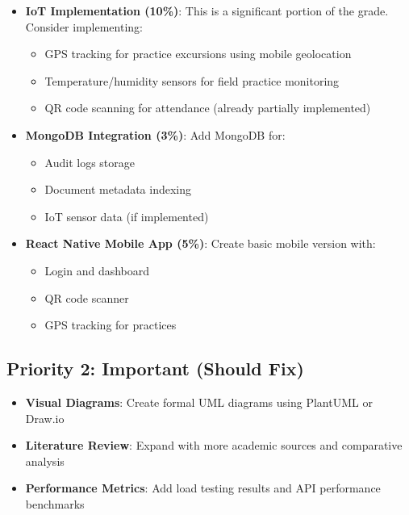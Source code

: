\documentclass[12pt,a4paper]{article}
\begin{document}
\begin{itemize}[leftmargin=*]
    \item \textbf{IoT Implementation (10\%)}: This is a significant portion of the grade. Consider implementing:
    \begin{itemize}
        \item GPS tracking for practice excursions using mobile geolocation
        \item Temperature/humidity sensors for field practice monitoring
        \item QR code scanning for attendance (already partially implemented)
    \end{itemize}
    
    \item \textbf{MongoDB Integration (3\%)}: Add MongoDB for:
    \begin{itemize}
        \item Audit logs storage
        \item Document metadata indexing
        \item IoT sensor data (if implemented)
    \end{itemize}
    
    \item \textbf{React Native Mobile App (5\%)}: Create basic mobile version with:
    \begin{itemize}
        \item Login and dashboard
        \item QR code scanner
        \item GPS tracking for practices
    \end{itemize}
\end{itemize}

\subsection{Priority 2: Important (Should Fix)}

\begin{itemize}[leftmargin=*]
    \item \textbf{Visual Diagrams}: Create formal UML diagrams using PlantUML or Draw.io
    \item \textbf{Literature Review}: Expand with more academic sources and comparative analysis
    \item \textbf{Performance Metrics}: Add load testing results and API performance benchmarks
\end{itemize}
\end{document}
